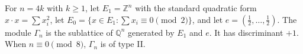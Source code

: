 For $n = 4k$ with $k \geq 1$, let $E_1 = \mathbb{Z}^n$ with the standard quadratic form $x \cdot x = \sum x_i^2$, let $E_0 = \{x \in E_1 : \sum x_i \equiv 0 \pmod{2}\}$, and let $e = (\frac{1}{2}, \ldots, \frac{1}{2})$. The module $\Gamma_n$ is the sublattice of $\mathbb{Q}^n$ generated by $E_1$ and $e$. It has discriminant $+1$. When $n \equiv 0 \pmod{8}$, $\Gamma_n$ is of type II.
